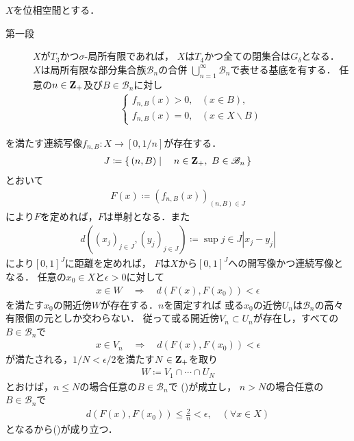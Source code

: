 	\begin{prf} $X$を位相空間とする．\mbox{}
		\begin{description}
			\item[第一段] $X$が$T_3$かつ$\sigma$-局所有限であれば，
				$X$は$T_4$かつ全ての閉集合は$G_\delta$となる．
				$X$は局所有限な部分集合族$\mathscr{B}_n$の合併
				$\bigcup_{n=1}^\infty \mathscr{B}_n$で表せる基底を有する．
				任意の$n \in \mathbf{Z}_+$及び$B \in \mathscr{B}_n$に対し
				\begin{align}
					\begin{cases}
						f_{n,B}(x) > 0, & (x \in B), \\
						f_{n,B}(x) = 0, & (x \in X \backslash B)
					\end{cases}
				\end{align}
		\end{description}
		を満たす連続写像$f_{n,B}:X \longrightarrow [0,1/n]$が存在する．
		\begin{align}
			J \coloneqq \left\{\, (n,B) \mid \quad n \in \mathbf{Z}_+,\ B \in \mathscr{B}_n\, \right\}
		\end{align}
		とおいて
		\begin{align}
			F(x) \coloneqq \left(f_{n,B}(x)\right)_{(n,B) \in J}
		\end{align}
		により$F$を定めれば，$F$は単射となる．また
		\begin{align}
			d\left((x_j)_{j \in J},(y_j)_{j \in J}\right)
			\coloneqq \sup{j \in J}{|x_j - y_j|}
		\end{align}
		により$[0,1]^J$に距離を定めれば，
		$F$は$X$から$[0,1]^J$への開写像かつ連続写像となる．
		任意の$x_0 \in X$と$\epsilon > 0$に対して
		\begin{align}
			x \in W \quad \Longrightarrow \quad d(F(x),F(x_0)) < \epsilon
			\label{eq:thm_Nagata_Smirnov_metrizability_1}
		\end{align}
		を満たす$x_0$の開近傍$W$が存在する．$n$を固定すれば
		或る$x_0$の近傍$U_n$は$\mathscr{B}_n$の高々有限個の元としか交わらない．
		従って或る開近傍$V_n \subset U_n$が存在し，すべての$B \in \mathscr{B}_n$で
		\begin{align}
			x \in V_n \quad \Longrightarrow \quad d(F(x),F(x_0)) < \epsilon
			\label{eq:thm_Nagata_Smirnov_metrizability_2}
		\end{align}
		が満たされる，$1/N < \epsilon/2$を満たす$N \in \mathbf{Z}_+$を取り
		\begin{align}
			W \coloneqq V_1 \cap \cdots \cap U_N
		\end{align}
		とおけば，$n \leq N$の場合任意の$B \in \mathscr{B}_n$で
		()が成立し，
		$n > N$の場合任意の$B \in \mathscr{B}_n$で
		\begin{align}
			d(F(x),F(x_0)) \leq \frac{2}{n} < \epsilon, \quad (\forall x \in X)
		\end{align}
		となるから()が成り立つ．
	\end{prf}
	
